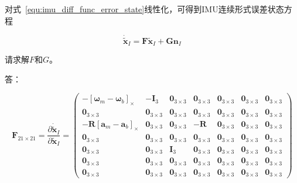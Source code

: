 \documentclass[12pt,a4paper]{article}
\begin{document}
对式~\eqref{equ:imu_diff_func_error_state}线性化，可得到IMU连续形式误差状态方程

\begin{equation}
\dot{\tilde{\mathbf{x}}}_I = 
\mathbf{F} \tilde{\mathbf{x}}_I + 
\mathbf{G} \mathbf{n}_I
\end{equation}

请求解$F$和$G$。\newline 

答：\newline 

\begin{equation*}
\mathbf{F}_{21 \times 21} = 
\frac{\partial \dot{\tilde{\mathbf{x}}}_I}{\partial \tilde{\mathbf{x}}_I} = 
\begin{pmatrix}
-\left[\boldsymbol{\omega}_{m}-\boldsymbol{\omega}_{b}\right]_{ \times} & -\mathbf{I}_3 & 
\mathbf{0}_{3\times 3} & \mathbf{0}_{3\times 3} & \mathbf{0}_{3\times 3} & \mathbf{0}_{3\times 3} & \mathbf{0}_{3\times 3} \\
\mathbf{0}_{3\times 3} & \mathbf{0}_{3\times 3} & \mathbf{0}_{3\times 3} & 
\mathbf{0}_{3\times 3} & \mathbf{0}_{3\times 3} & \mathbf{0}_{3\times 3} & \mathbf{0}_{3\times 3} \\
-\mathbf{R}\left[\mathbf{a}_{m}-\mathbf{a}_{b}\right]_{ \times} & 
\mathbf{0}_{3\times 3} & \mathbf{0}_{3\times 3} & 
-\mathbf{R} & \mathbf{0}_{3\times 3} & \mathbf{0}_{3\times 3} & \mathbf{0}_{3\times 3} \\
\mathbf{0}_{3\times 3} & \mathbf{0}_{3\times 3} & \mathbf{0}_{3\times 3} & 
\mathbf{0}_{3\times 3} & \mathbf{0}_{3\times 3} & \mathbf{0}_{3\times 3} & \mathbf{0}_{3\times 3} \\
\mathbf{0}_{3\times 3} & \mathbf{0}_{3\times 3} & \mathbf{I}_3 & 
\mathbf{0}_{3\times 3} & \mathbf{0}_{3\times 3} & \mathbf{0}_{3\times 3} & \mathbf{0}_{3\times 3} \\
\mathbf{0}_{3\times 3} & \mathbf{0}_{3\times 3} & \mathbf{0}_{3\times 3} & 
\mathbf{0}_{3\times 3} & \mathbf{0}_{3\times 3} & \mathbf{0}_{3\times 3} & \mathbf{0}_{3\times 3} \\
\mathbf{0}_{3\times 3} & \mathbf{0}_{3\times 3} & \mathbf{0}_{3\times 3} & 
\mathbf{0}_{3\times 3} & \mathbf{0}_{3\times 3} & \mathbf{0}_{3\times 3} & \mathbf{0}_{3\times 3}
\end{pmatrix}
\end{equation*}
\end{document}
